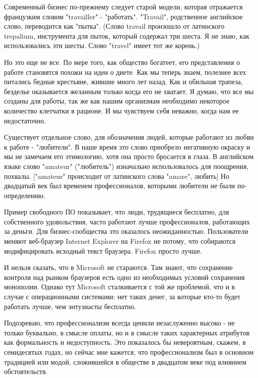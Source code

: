 \documentclass[ebook,12pt,oneside,openany]{memoir}
\begin{document}
Современный бизнес по-прежнему следует старой модели, которая
отражается французким словом "travailler" - "работать". "Travail",
родственное английское слово, переводится как "пытка". (Слово travail
произошло от латинского trepalium, инструмента для пыток, который
содержал три шеста. Я не знаю, как использовались эти шесты. Слово
"travel" имеет тот же корень.)

Но это еще не все. По мере того, как общество богатеет, его
представления о работе становятся похожи на идеи о диете. Как мы
теперь знаем, полезнее всех питались бедные крестьяне, жившие много
лет назад. Как и обильная трапеза, безделье оказывается желанным
только когда его не хватает. Я думаю, что все мы созданы для работы,
так же как нашим организмам необходимо некоторое количество клетчатки
в рационе. И мы чувствуем себя неважно, когда нам ее недостаточно.

Существует отдельное слово, для обозначения людей, которые работают из
любви к работе - "любители". В наше время это слово приобрело
негативную окраску и мы не замечаем его этимологию, хотя она просто
бросается в глаза. В английском языке слово "amateur" ("любитель")
изначально использовалось для поощрения, похвалы. ["amateur"
происходит от латинского слова "amare", любить] Но двадцатый век был
временем профессионалов, которыми любители не были по-определению.

Пример свободного ПО показывает, что люди, трудящиеся бесплатно, для
собственного удовольствия, часто работают лучше профессионалов,
работающих за деньги. Для бизнес-сообщества это оказалось
неожиданностью. Пользователи меняют веб-браузер Internet Explorer на
Firefox не потому, что собираются модифицировать исходный текст
браузера. Firefox просто лучше.

И нельзя сказать, что в Microsoft не стараются. Там знают, что
сохранение контроля над рынком браузеров есть одно из необходимых
условий сохранения монополии. Однако тут Microsoft сталкивается с той
же проблемой, что и в случае с операционными системами: нет таких
денег, за которые кто-то будет работать лучше, чем энтузиасты
бесплатно.

Подозреваю, что профессионализм всегда ценили незаслуженно высоко - не
только буквально, в смысле оплаты, но и в смысле таких характерных
атрибутов как формальность и недоступность. Это показалось бы
невероятным, скажем, в семидесятых годах, но сейчас мне кажется, что
профессионализм был в основном традицией или модой, сложившейся в
обществе в двадцатом веке под влиянием обстоятельств.
\end{document}
